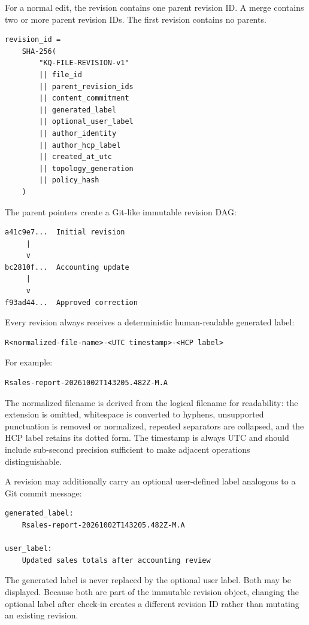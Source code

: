 \documentclass[11pt]{article}
\begin{document}
For a normal edit, the revision contains one parent revision ID. A merge contains two or more parent revision IDs. The first revision contains no parents.

\begin{lstlisting}
revision_id =
    SHA-256(
        "KQ-FILE-REVISION-v1"
        || file_id
        || parent_revision_ids
        || content_commitment
        || generated_label
        || optional_user_label
        || author_identity
        || author_hcp_label
        || created_at_utc
        || topology_generation
        || policy_hash
    )
\end{lstlisting}

The parent pointers create a Git-like immutable revision DAG:

\begin{lstlisting}
a41c9e7...  Initial revision
     |
     v
bc2810f...  Accounting update
     |
     v
f93ad44...  Approved correction
\end{lstlisting}

Every revision always receives a deterministic human-readable generated label:

\begin{lstlisting}
R<normalized-file-name>-<UTC timestamp>-<HCP label>
\end{lstlisting}

For example:

\begin{lstlisting}
Rsales-report-20261002T143205.482Z-M.A
\end{lstlisting}

The normalized filename is derived from the logical filename for readability: the extension is omitted, whitespace is converted to hyphens, unsupported punctuation is removed or normalized, repeated separators are collapsed, and the HCP label retains its dotted form. The timestamp is always UTC and should include sub-second precision sufficient to make adjacent operations distinguishable.

A revision may additionally carry an optional user-defined label analogous to a Git commit message:

\begin{lstlisting}
generated_label:
    Rsales-report-20261002T143205.482Z-M.A

user_label:
    Updated sales totals after accounting review
\end{lstlisting}

The generated label is never replaced by the optional user label. Both may be displayed. Because both are part of the immutable revision object, changing the optional label after check-in creates a different revision ID rather than mutating an existing revision.
\end{document}
